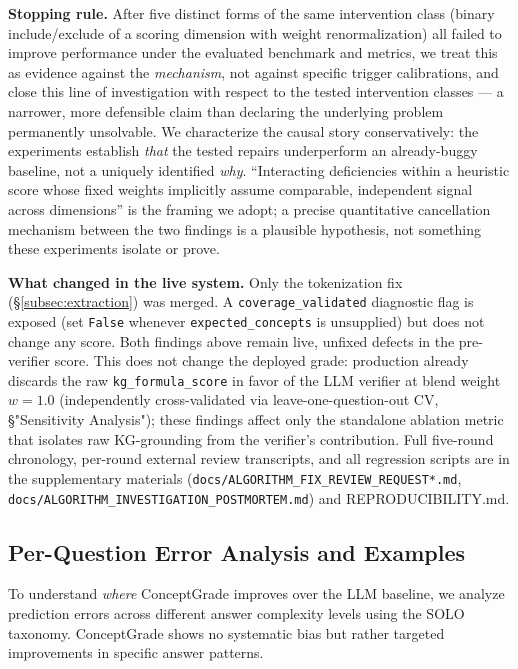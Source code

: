 \documentclass[conference]{IEEEtran}
\begin{document}
\textbf{Stopping rule.} After five distinct forms of the same
intervention class (binary include/exclude of a scoring dimension with
weight renormalization) all failed to improve performance under the
evaluated benchmark and metrics, we treat this as evidence against the
\emph{mechanism}, not against specific trigger calibrations, and close
this line of investigation with respect to the tested intervention
classes — a narrower, more defensible claim than declaring the underlying
problem permanently unsolvable. We characterize the causal story
conservatively: the experiments establish \emph{that} the tested repairs
underperform an already-buggy baseline, not a uniquely identified
\emph{why}. ``Interacting deficiencies within a heuristic score whose
fixed weights implicitly assume comparable, independent signal across
dimensions'' is the framing we adopt; a precise quantitative cancellation
mechanism between the two findings is a plausible hypothesis, not
something these experiments isolate or prove.

\textbf{What changed in the live system.} Only the tokenization fix
(\S\ref{subsec:extraction}) was merged. A \texttt{coverage\_validated}
diagnostic flag is exposed (set \texttt{False} whenever
\texttt{expected\_concepts} is unsupplied) but does not change any score.
Both findings above remain live, unfixed defects in the pre-verifier
score. This does not change the deployed grade: production already
discards the raw \texttt{kg\_formula\_score} in favor of the LLM verifier
at blend weight $w=1.0$ (independently cross-validated via
leave-one-question-out CV, \S"Sensitivity Analysis"); these findings affect only the standalone
ablation metric that isolates raw KG-grounding from the verifier's
contribution. Full five-round chronology, per-round external review
transcripts, and all regression scripts are in the supplementary
materials (\texttt{docs/ALGORITHM\_FIX\_REVIEW\_REQUEST*.md},
\texttt{docs/ALGORITHM\_INVESTIGATION\_POSTMORTEM.md}) and
REPRODUCIBILITY.md.

\subsection{Per-Question Error Analysis and Examples}

To understand \emph{where} ConceptGrade improves over the LLM baseline, we analyze
prediction errors across different answer complexity levels using the SOLO taxonomy.
ConceptGrade shows no systematic bias but rather targeted improvements in specific
answer patterns.
\end{document}
